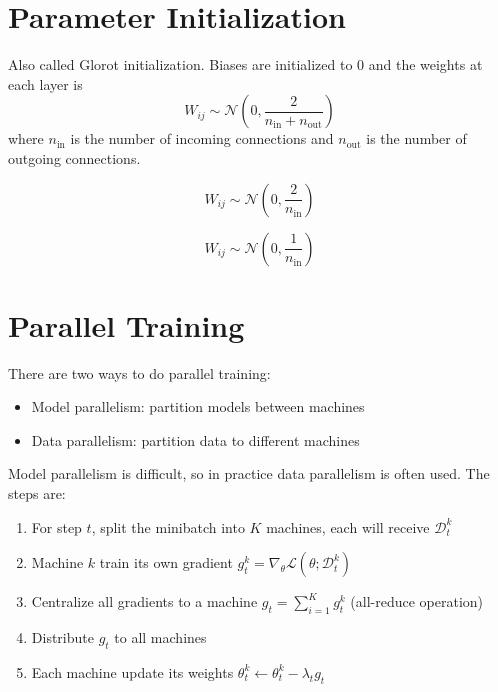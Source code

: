 \section{Parameter Initialization}

\begin{definition}
    Also called Glorot initialization. Biases are initialized to $0$ and the weights at each layer is
    \begin{equation}
        W_{ij} \sim \mathcal{N}\left(0, \frac{2}{n_{\text{in}} + n_{\text{out}}} \right)
    \end{equation}
    where $n_{\text{in}}$ is the number of incoming connections and $n_{\text{out}}$ is the number of outgoing connections.
\end{definition}

\begin{definition}[He Initialization]
    \begin{equation}
        W_{ij} \sim \mathcal{N}\left(0, \frac{2}{n_{\text{in}}} \right)
    \end{equation}
\end{definition}

\begin{definition}
    \begin{equation}
        W_{ij} \sim \mathcal{N}\left(0, \frac{1}{n_{\text{in}}} \right)
    \end{equation}
\end{definition}



\section{Parallel Training}

There are two ways to do parallel training:
\begin{itemize}
    \item Model parallelism: partition models between machines
    \item Data parallelism: partition data to different machines
\end{itemize}

Model parallelism is difficult, so in practice data parallelism is often used. The steps are:
\begin{enumerate}
    \item For step $t$, split the minibatch into $K$ machines, each will receive $\mathcal{D}_t^k$
    \item Machine $k$ train its own gradient $g_t^k = \nabla_\theta \mathcal{L}(\theta;\mathcal{D}_t^k)$
    \item Centralize all gradients to a machine $g_t = \sum_{i=1}^K g_t^k$ (all-reduce operation)
    \item Distribute $g_t$ to all machines
    \item Each machine update its weights $\theta_t^k \leftarrow \theta_t^k - \lambda_t g_t$
\end{enumerate}

